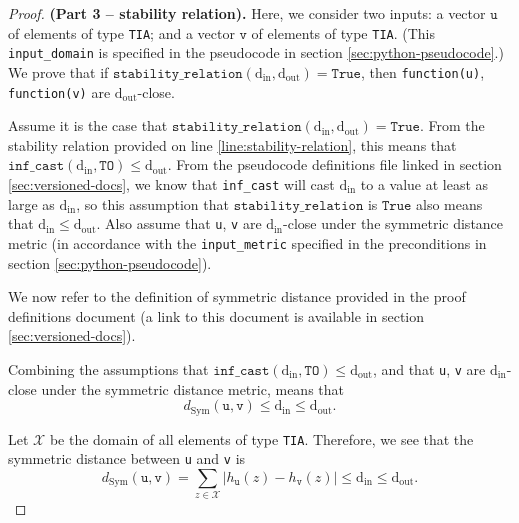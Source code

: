 \documentclass[11pt,letterpaper]{article}
\newcommand{\din}{\mathrm{d_{in}}}
\newcommand{\dout}{\mathrm{d_{out}}}
\newcommand{\question}[1]{\textcolor{red}{\textbf{Question:} #1}}
\newcommand{\True}{\texttt{True}}
\theoremstyle{definition}
\begin{document}

\begin{proof} \textbf{(Part 3 -- stability relation).} Here, we consider two inputs: a vector $\texttt{u}$ of elements of type \texttt{TIA}; and a vector $\texttt{v}$ of elements of type \texttt{TIA}. (This \texttt{input\_domain} is specified in the pseudocode in section \ref{sec:python-pseudocode}.) We prove that if $\texttt{stability\_relation}(\din, \dout) = \True$, then \texttt{function(u)}, \texttt{function(v)} are $\dout$-close.

Assume it is the case that $\texttt{stability\_relation}(\din, \dout) = \True$. From  the stability relation provided on line \ref{line:stability-relation}, this means that $\texttt{inf\_cast}(\din, \texttt{TO}) \leq \dout$. From the pseudocode definitions file linked in section \ref{sec:versioned-docs}, we know that \texttt{inf\_cast} will cast $\din$ to a value at least as large as $\din$, so this assumption that $\texttt{stability\_relation}$ is $\True$ also means that $\din \leq \dout$. Also assume that \texttt{u}, \texttt{v} are $\din$-close under the symmetric distance metric (in accordance with the \texttt{input\_metric} specified in the preconditions in section \ref{sec:python-pseudocode}).

We now refer to the definition of symmetric distance provided in the proof definitions document (a link to this document is available in section \ref{sec:versioned-docs}).

Combining the assumptions that $\texttt{inf\_cast}(\din, \texttt{TO}) \leq \dout$, and that \texttt{u}, \texttt{v} are $\din$-close under the symmetric distance metric, means that
\begin{equation}
    d_\text{Sym}(\texttt{u}, \texttt{v})
    \leq \din \leq \dout.
\end{equation}

Let $\mathcal{X}$ be the domain of all elements of type \texttt{TIA}. Therefore, we see that the symmetric distance  between \texttt{u} and \texttt{v} is 
\begin{equation}
\label{eq:expand-dymm-dist}
    d_\text{Sym}(\texttt{u}, \texttt{v}) = \sum_{z\in \mathcal{X}} |h_{\texttt{u}}(z) - h_{\texttt{v}}(z)| \leq \din \leq \dout.
\end{equation}


\end{proof}
\end{document}
